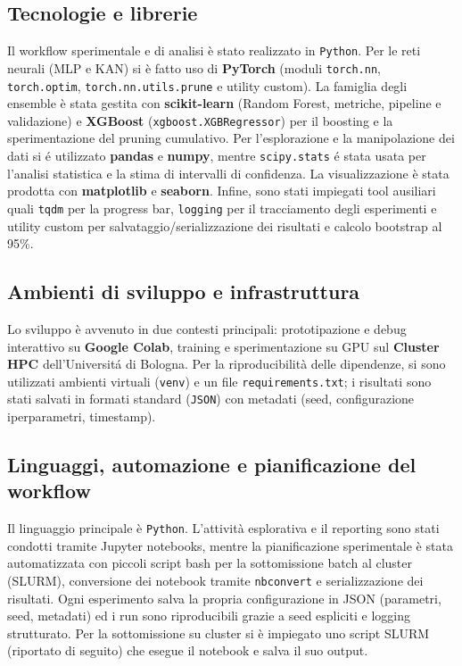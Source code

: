 \documentclass[a4paper,12pt]{report}
\begin{document}
	\subsection{Tecnologie e librerie}
	Il workflow sperimentale e di analisi è stato realizzato in \texttt{Python}. Per le reti neurali (MLP e KAN) si è fatto uso di \textbf{PyTorch} (moduli \texttt{torch.nn}, \texttt{torch.optim}, \texttt{torch.nn.utils.prune} e utility custom). La famiglia degli ensemble è stata gestita con \textbf{scikit-learn} (Random Forest, metriche, pipeline e validazione) e \textbf{XGBoost} (\texttt{xgboost.XGBRegressor}) per il boosting e la sperimentazione del pruning cumulativo. Per l'esplorazione e la manipolazione dei dati si é utilizzato \textbf{pandas} e \textbf{numpy}, mentre \texttt{scipy.stats} é stata usata per l'analisi statistica e la stima di intervalli di confidenza. La visualizzazione è stata prodotta con \textbf{matplotlib} e \textbf{seaborn}. Infine, sono stati impiegati tool ausiliari quali \texttt{tqdm} per la progress bar, \texttt{logging} per il tracciamento degli esperimenti e utility custom per salvataggio/serializzazione dei risultati e calcolo bootstrap al 95\%.
	
	\subsection{Ambienti di sviluppo e infrastruttura}
	Lo sviluppo è avvenuto in due contesti principali: prototipazione e debug interattivo su \textbf{Google Colab}, training e sperimentazione su GPU sul \textbf{Cluster HPC} dell'Universitá di Bologna. Per la riproducibilità delle dipendenze, si sono utilizzati ambienti virtuali (\texttt{venv}) e un file \texttt{requirements.txt}; i risultati sono stati salvati in formati standard (\texttt{JSON}) con metadati (seed, configurazione iperparametri, timestamp).
	
	\subsection{Linguaggi, automazione e pianificazione del workflow}
	Il linguaggio principale è \texttt{Python}. L'attività esplorativa e il reporting sono stati condotti tramite Jupyter notebooks, mentre la pianificazione sperimentale è stata automatizzata con piccoli script bash per la sottomissione batch al cluster (SLURM), conversione dei notebook tramite \texttt{nbconvert} e serializzazione dei risultati. Ogni esperimento salva la propria configurazione in JSON (parametri, seed, metadati) ed i run sono riproducibili grazie a seed espliciti e logging strutturato. Per la sottomissione su cluster si è impiegato uno script SLURM (riportato di seguito) che esegue il notebook e salva il suo output.
	
\end{document}
